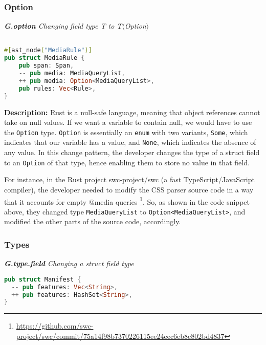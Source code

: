 \subsubsection{Option}
\vspace{3mm}

\noindent\textit{\textbf{G.option} Changing field type T to T$\langle$Option$\rangle$}

\begin{lstlisting}[language=Rust, style=colouredRust]

#[ast_node("MediaRule")]
pub struct MediaRule {
    pub span: Span,
    -- pub media: MediaQueryList,
    ++ pub media: Option<MediaQueryList>,
    pub rules: Vec<Rule>,
}

\end{lstlisting}

\noindent\textbf{Description:} Rust is a null-safe language, meaning that object references cannot take on null values. If we want a variable to contain null, we would have to use the \texttt{Option} type. \texttt{Option} is essentially an \texttt{enum} with two variants, \texttt{Some}, which indicates that our variable has a value, and \texttt{None}, which indicates the absence of any value. In this change pattern, the developer changes the type of a struct field to an \texttt{Option} of that type, hence enabling them to store no value in that field.

For instance, in the Rust project swc-project/swc (a fast TypeScript/JavaScript compiler), the developer needed to modify the CSS parser source code in a way that it accounts for empty @media queries \footnote{\url{https://github.com/swc-project/swc/commit/75a14f98b7370226115ee24eec6eb8c802bd4837}}. So, as shown in the code snippet above, they changed type \texttt{MediaQueryList} to \verb+Option<MediaQueryList>+, and modified the other parts of the source code, accordingly.


\subsubsection{Types}
\vspace{3mm}

\noindent\textit{\label{sec:G.type.field}\textbf{G.type.field} Changing a struct field type}

\begin{lstlisting}[language=Rust, style=colouredRust]
pub struct Manifest {
  -- pub features: Vec<String>,
  ++ pub features: HashSet<String>,
}

\end{lstlisting}

